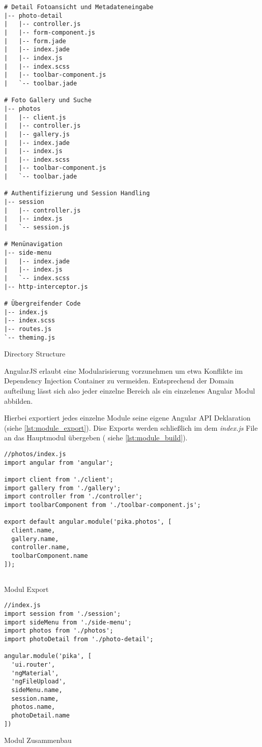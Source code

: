 \begin{listing}[H]
\begin{verbatim}
# Detail Fotoansicht und Metadateneingabe 
|-- photo-detail 
|   |-- controller.js
|   |-- form-component.js
|   |-- form.jade
|   |-- index.jade
|   |-- index.js
|   |-- index.scss
|   |-- toolbar-component.js
|   `-- toolbar.jade

# Foto Gallery und Suche
|-- photos
|   |-- client.js
|   |-- controller.js
|   |-- gallery.js
|   |-- index.jade
|   |-- index.js
|   |-- index.scss
|   |-- toolbar-component.js
|   `-- toolbar.jade

# Authentifizierung und Session Handling
|-- session
|   |-- controller.js
|   |-- index.js
|   `-- session.js

# Menünavigation
|-- side-menu
|   |-- index.jade
|   |-- index.js
|   `-- index.scss
|-- http-interceptor.js

# Übergreifender Code
|-- index.js
|-- index.scss
|-- routes.js
`-- theming.js
\end{verbatim}
\caption{Directory Structure}
\label{lst:directorty_structure}
\end{listing}

AngularJS erlaubt eine Modularisierung vorzunehmen um etwa Konflikte im Dependency Injection Container zu vermeiden. Entsprechend der Domain aufteilung lässt sich also jeder einzelne Bereich als ein einzelenes Angular Modul abbilden.

Hierbei exportiert jedes einzelne Module seine eigene Angular API Deklaration (siehe \ref{lst:module_export}). Dise Exports werden schließlich im dem \textit{index.js} File an das  Hauptmodul übergeben ( siehe \ref{lst:module_build}).


\begin{listing}[H]
\begin{verbatim}
//photos/index.js
import angular from 'angular';

import client from './client';
import gallery from './gallery';
import controller from './controller';
import toolbarComponent from './toolbar-component.js';

export default angular.module('pika.photos', [
  client.name,
  gallery.name,
  controller.name,
  toolbarComponent.name
]);
 
\end{verbatim}
\caption{Modul Export}
\label{lst:module_export}
\end{listing}

\begin{listing}[H]
\begin{verbatim}
//index.js
import session from './session';
import sideMenu from './side-menu';
import photos from './photos';
import photoDetail from './photo-detail';

angular.module('pika', [
  'ui.router',
  'ngMaterial',
  'ngFileUpload',
  sideMenu.name,
  session.name,
  photos.name,
  photoDetail.name
])
\end{verbatim}
\caption{Modul Zusammenbau}
\label{lst:module_build}
\end{listing}


